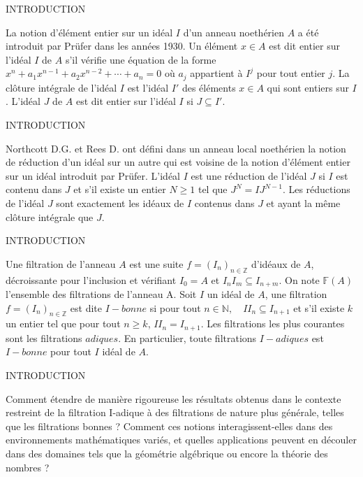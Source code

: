 \documentclass[11pt,a4paper]{beamer}
\begin{document}
\begin{frame}{INTRODUCTION}
\begin{block}{}
La notion d'élément entier sur un idéal $I$ d'un anneau noethérien $A$ a été introduit par Prüfer dans les années 1930. Un élément $x \in A $ est dit entier sur l'idéal $I$ de $A$ s'il vérifie une équation de la forme $x^n + a_1 x^{n-1} +a_2 x^{n-2}+ \cdots + a_n = 0$ où $a_j$ appartient à $I^j$ pour tout entier $j$. La clôture intégrale de l'idéal $I$ est l'idéal $I'$ des éléments $x \in A$ qui sont entiers sur $I$. L'idéal $J$ de $A$ est dit entier sur l'idéal $I$ si $J \subseteq I'$.
\end{block}
\end{frame}
\begin{frame}{INTRODUCTION}
	\begin{block}{}
		Northcott D.G. et Rees D. ont défini dans un anneau local noethérien la notion de réduction d'un idéal sur un autre qui est voisine de la notion d'élément entier sur un idéal introduit par Prüfer. L'idéal $I$ est une réduction de l'idéal $J$ si $I$ est contenu dans $J$ et s'il existe un entier $N \geqslant 1$ tel que $J^N = IJ^{N-1}$. Les réductions de l'idéal $J$ sont exactement les idéaux de $I$ contenus dans $J$ et ayant la même clôture intégrale que $J$.\\
	\end{block}
\end{frame}

\begin{frame}{INTRODUCTION}
	\begin{block}{}
		Une filtration de l'anneau $A$ est une suite $f=(I_n)_{n \in \mathbb{Z}}$ d'idéaux de $A$, décroissante pour l'inclusion et vérifiant $I_0 = A$ et $I_n I_m \subseteq I_{n+m}$. On note $\mathbb{F}(A)$ l'ensemble des filtrations de l'anneau A. Soit $I$ un idéal de $A$, une filtration $f=(I_n)_{n \in \mathbb{Z}}$ est dite $I-bonne$ si pour tout $n \in \mathbb{N}, \quad II_n \subseteq I_{n+1}$ et s'il existe $k$ un entier tel que pour tout $n \geqslant k$, $II_n = I_{n+1}$. Les filtrations les plus courantes sont les filtrations $adiques$. En particulier, toute filtrations $I-adiques$ est $I-bonne$ pour tout $I$ idéal de $A$.
	\end{block}
\end{frame}

\begin{frame}{INTRODUCTION}
	\begin{block}{}
		Comment étendre de manière rigoureuse les résultats obtenus dans le contexte restreint de la filtration I-adique à des filtrations de nature plus générale, telles que les filtrations bonnes ? Comment ces notions interagissent-elles dans des environnements mathématiques variés, et quelles applications peuvent en découler dans des domaines tels que la géométrie algébrique ou encore la théorie des nombres ? 
	\end{block}
\end{frame}
\end{document}

